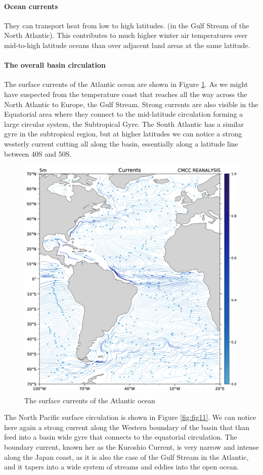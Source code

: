 \paragraph{Ocean currents}
They can transport heat from low to high latitudes. (in the Gulf Stream of the North Atlantic). This contributes to much higher winter air temperatures over mid-to-high latitude oceans than over adjacent land areas at the same latitude. 

\paragraph{The overall basin
circulation}\label{the-overall-basin-circulation}

The surface currents of the Atlantic ocean are shown in Figure \ref{fig:fig10}. As we might have suspected from the temperature coast that reaches all the way across the North Atlantic to Europe, the Gulf Stream. Strong currents are also visible in the Equatorial area
where they connect to the mid-latitude circulation forming a large circular system, the Subtropical Gyre. The South Atlantic has a similar gyre in the subtropical region, but at higher latitudes we can notice a strong westerly current cutting all along the basin, essentially along a latitude line between 40S and 50S.

\begin{figure}[htpb]
\centering
\includegraphics[width = 0.4 \textwidth]{uploads/35image.png}
\caption{The surface currents of the Atlantic ocean} \label{fig:fig10}
\end{figure}

The North Pacific surface circulation is shown in Figure \ref{fig:fig11}. We can notice here again a strong current along the Western boundary of the basin that than feed into a basin wide gyre that connects to the equatorial circulation. The boundary current, known her as the Kuroshio Current, is very narrow and intense along the Japan coast, as it is also the case of the Gulf Stream in the Atlantic, and it tapers into a wide system of streams and eddies into the open ocean.

